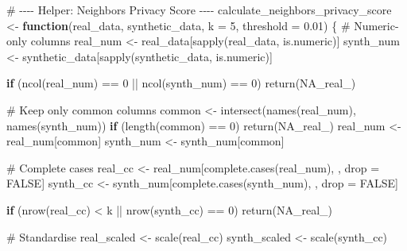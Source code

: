\documentclass[
  letterpaper,
  DIV=11,
  numbers=noendperiod]{scrartcl}
\newenvironment{Shaded}{\begin{snugshade}}{\end{snugshade}}
\newcommand{\AttributeTok}[1]{\textcolor[rgb]{0.40,0.45,0.13}{#1}}
\newcommand{\CommentTok}[1]{\textcolor[rgb]{0.37,0.37,0.37}{#1}}
\newcommand{\ConstantTok}[1]{\textcolor[rgb]{0.56,0.35,0.01}{#1}}
\newcommand{\ControlFlowTok}[1]{\textcolor[rgb]{0.00,0.23,0.31}{\textbf{#1}}}
\newcommand{\DecValTok}[1]{\textcolor[rgb]{0.68,0.00,0.00}{#1}}
\newcommand{\FloatTok}[1]{\textcolor[rgb]{0.68,0.00,0.00}{#1}}
\newcommand{\FunctionTok}[1]{\textcolor[rgb]{0.28,0.35,0.67}{#1}}
\newcommand{\NormalTok}[1]{\textcolor[rgb]{0.00,0.23,0.31}{#1}}
\newcommand{\OtherTok}[1]{\textcolor[rgb]{0.00,0.23,0.31}{#1}}
\newcommand{\SpecialCharTok}[1]{\textcolor[rgb]{0.37,0.37,0.37}{#1}}
\begin{document}
\begin{Shaded}
\begin{Highlighting}[]
\CommentTok{\# {-}{-}{-}{-} Helper: Neighbors\textquotesingle{} Privacy Score {-}{-}{-}{-}}
\NormalTok{calculate\_neighbors\_privacy\_score }\OtherTok{\textless{}{-}} \ControlFlowTok{function}\NormalTok{(real\_data, synthetic\_data, }\AttributeTok{k =} \DecValTok{5}\NormalTok{, }\AttributeTok{threshold =} \FloatTok{0.01}\NormalTok{) \{}
  \CommentTok{\# Numeric{-}only columns}
\NormalTok{  real\_num  }\OtherTok{\textless{}{-}}\NormalTok{ real\_data[}\FunctionTok{sapply}\NormalTok{(real\_data, is.numeric)]}
\NormalTok{  synth\_num }\OtherTok{\textless{}{-}}\NormalTok{ synthetic\_data[}\FunctionTok{sapply}\NormalTok{(synthetic\_data, is.numeric)]}
  
  \ControlFlowTok{if}\NormalTok{ (}\FunctionTok{ncol}\NormalTok{(real\_num) }\SpecialCharTok{==} \DecValTok{0} \SpecialCharTok{||} \FunctionTok{ncol}\NormalTok{(synth\_num) }\SpecialCharTok{==} \DecValTok{0}\NormalTok{) }\FunctionTok{return}\NormalTok{(}\ConstantTok{NA\_real\_}\NormalTok{)}
  
  \CommentTok{\# Keep only common columns}
\NormalTok{  common }\OtherTok{\textless{}{-}} \FunctionTok{intersect}\NormalTok{(}\FunctionTok{names}\NormalTok{(real\_num), }\FunctionTok{names}\NormalTok{(synth\_num))}
  \ControlFlowTok{if}\NormalTok{ (}\FunctionTok{length}\NormalTok{(common) }\SpecialCharTok{==} \DecValTok{0}\NormalTok{) }\FunctionTok{return}\NormalTok{(}\ConstantTok{NA\_real\_}\NormalTok{)}
\NormalTok{  real\_num  }\OtherTok{\textless{}{-}}\NormalTok{ real\_num[common]}
\NormalTok{  synth\_num }\OtherTok{\textless{}{-}}\NormalTok{ synth\_num[common]}
  
  \CommentTok{\# Complete cases}
\NormalTok{  real\_cc  }\OtherTok{\textless{}{-}}\NormalTok{ real\_num[}\FunctionTok{complete.cases}\NormalTok{(real\_num), , drop }\OtherTok{=} \ConstantTok{FALSE}\NormalTok{]}
\NormalTok{  synth\_cc }\OtherTok{\textless{}{-}}\NormalTok{ synth\_num[}\FunctionTok{complete.cases}\NormalTok{(synth\_num), , drop }\OtherTok{=} \ConstantTok{FALSE}\NormalTok{]}
  
  \ControlFlowTok{if}\NormalTok{ (}\FunctionTok{nrow}\NormalTok{(real\_cc) }\SpecialCharTok{\textless{}}\NormalTok{ k }\SpecialCharTok{||} \FunctionTok{nrow}\NormalTok{(synth\_cc) }\SpecialCharTok{==} \DecValTok{0}\NormalTok{) }\FunctionTok{return}\NormalTok{(}\ConstantTok{NA\_real\_}\NormalTok{)}
  
  \CommentTok{\# Standardise}
\NormalTok{  real\_scaled  }\OtherTok{\textless{}{-}} \FunctionTok{scale}\NormalTok{(real\_cc)}
\NormalTok{  synth\_scaled }\OtherTok{\textless{}{-}} \FunctionTok{scale}\NormalTok{(synth\_cc)}
  

\end{Highlighting}
\end{Shaded}
\end{document}
